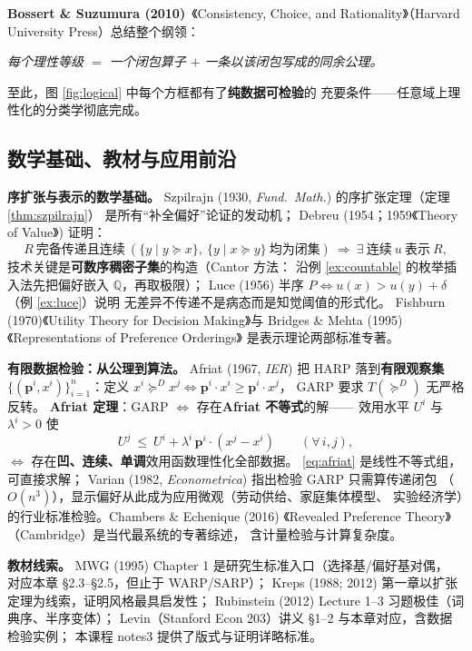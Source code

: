 \textbf{Bossert \& Suzumura (2010)}\ 《Consistency, Choice, and
Rationality》（Harvard University Press）总结整个纲领：
\begin{center}
\emph{每个理性等级 $=$ 一个闭包算子 $+$ 一条以该闭包写成的同余公理。}
\end{center}
至此，图 \ref{fig:logical} 中每个方框都有了\textbf{纯数据可检验}的
充要条件——任意域上理性化的分类学彻底完成。

\subsection{数学基础、教材与应用前沿}

\textbf{序扩张与表示的数学基础。}
Szpilrajn (1930, \emph{Fund.\ Math.}) 的序扩张定理（定理 \ref{thm:szpilrajn}）
是所有“补全偏好”论证的发动机；
Debreu (1954；1959《Theory of Value》) 证明：
\begin{equation}
R\ \text{完备传递且}\textbf{连续}\ (\{y\mid y\succeq x\},\ \{y\mid x\succeq y\}
\ \text{均为闭集})\ \Longrightarrow\ \exists\ \text{连续}\ u\ \text{表示}\ R,
\end{equation}
技术关键是\textbf{可数序稠密子集}的构造（Cantor 方法：
沿例 \ref{ex:countable} 的枚举插入法先把偏好嵌入 $\mathbb{Q}$，再取极限）；
Luce (1956) 半序 $P \iff u(x)>u(y)+\delta$（例 \ref{ex:luce}）说明
无差异不传递不是病态而是知觉阈值的形式化。
Fishburn (1970)《Utility Theory for Decision Making》与
Bridges \& Mehta (1995)《Representations of Preference Orderings》
是表示理论两部标准专著。

\textbf{有限数据检验：从公理到算法。}
Afriat (1967, \emph{IER}) 把 HARP 落到\textbf{有限观察集}
$\{(\boldsymbol{p}^i,x^i)\}_{i=1}^n$：定义
$x^i\succeq^D x^j \iff \boldsymbol{p}^i\cdot x^i\ge\boldsymbol{p}^i\cdot x^j$，
GARP 要求 $T(\succeq^D)$ 无严格反转。
\textbf{Afriat 定理}：GARP $\iff$ 存在\textbf{Afriat 不等式}的解——
效用水平 $U^i$ 与 $\lambda^i>0$ 使
\begin{equation}
U^j\ \le\ U^i+\lambda^i\,\boldsymbol{p}^i\cdot(x^j-x^i)
\qquad(\forall\, i,j),
\label{eq:afriat}
\end{equation}
$\iff$ 存在\textbf{凹、连续、单调}效用函数理性化全部数据。
\eqref{eq:afriat} 是线性不等式组，可直接求解；
Varian (1982, \emph{Econometrica}) 指出检验 GARP 只需算传递闭包
（$O(n^3)$），显示偏好从此成为应用微观（劳动供给、家庭集体模型、
实验经济学）的行业标准检验。Chambers \& Echenique (2016)
《Revealed Preference Theory》（Cambridge）是当代最系统的专著综述，
含计量检验与计算复杂度。

\textbf{教材线索。}
MWG (1995) Chapter 1 是研究生标准入口（选择基/偏好基对偶，
对应本章 §2.3--§2.5，但止于 WARP/SARP）；
Kreps (1988; 2012) 第一章以扩张定理为线索，证明风格最具启发性；
Rubinstein (2012) Lecture 1--3 习题极佳（词典序、半序变体）；
Levin（Stanford Econ 203）讲义 §1--2 与本章对应，含数据检验实例；
本课程 notes3 提供了版式与证明详略标准。

